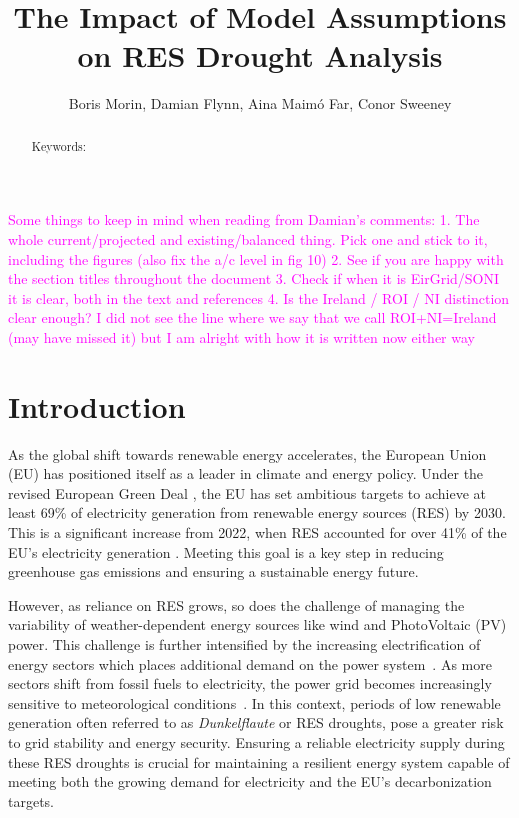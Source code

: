 \documentclass[a4paper, 11pt]{article}
\title{The Impact of Model Assumptions on RES Drought Analysis}
\author{Boris Morin, Damian Flynn, Aina Maimó Far, Conor Sweeney}
\begin{document}
\maketitle

\begin{abstract}


Keywords: 
\end{abstract}

\textcolor{magenta}{Some things to keep in mind when reading from Damian's comments:
	1. The whole current/projected and existing/balanced thing. Pick one and stick to it, including the figures (also fix the a/c level in fig 10)
	2. See if you are happy with the section titles throughout the document
	3. Check if when it is EirGrid/SONI it is clear, both in the text and references
	4. Is the Ireland / ROI / NI distinction clear enough? I did not see the line where we say that we call ROI+NI=Ireland (may have missed it) but I am alright with how it is written now either way}

\section{Introduction}
\label{sec:Intro}

As the global shift towards renewable energy accelerates, the European Union (EU) has positioned itself as a leader in climate and energy policy. Under the revised European Green Deal \cite{greendeal2023report}, the EU has set ambitious targets to achieve at least 69\% of electricity generation from renewable energy sources (RES) by 2030. This is a significant increase from 2022, when RES accounted for over 41\% of the EU’s electricity generation \cite{europe2023stat}. Meeting this goal is a key step in reducing greenhouse gas emissions and ensuring a sustainable energy future.

However, as reliance on RES grows, so does the challenge of managing the variability of weather-dependent energy sources like wind and PhotoVoltaic (PV) power. This challenge is further intensified by the increasing electrification of energy sectors which places additional demand on the power system~\cite{bloomfield2021}. As more sectors shift from fossil fuels to electricity, the power grid becomes increasingly sensitive to meteorological conditions~\cite{bloomfield2016, vanderWiel2019drought}. In this context, periods of low renewable generation often referred to as \textit{Dunkelflaute} or RES droughts, pose a greater risk to grid stability and energy security. Ensuring a reliable electricity supply during these RES droughts is crucial for maintaining a resilient energy system capable of meeting both the growing demand for electricity and the EU’s decarbonization targets.
\end{document}
